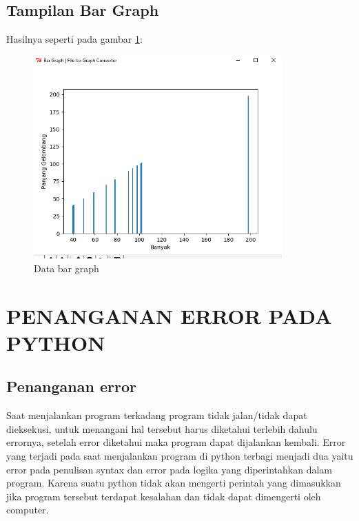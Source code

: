 \subsection{Tampilan Bar Graph}
Hasilnya seperti pada gambar \ref{fig:bargraph}:
\begin{figure}[!htbp]
	\centerline{\includegraphics[width=0.85\textwidth]{figures/3/bargraph.PNG}}
	\caption{Data bar graph}
	\label{fig:bargraph}
\end{figure}

\section{PENANGANAN ERROR PADA PYTHON}
\subsection{Penanganan error}
Saat menjalankan program terkadang program tidak jalan/tidak dapat dieksekusi, untuk menangani hal tersebut harus diketahui terlebih dahulu errornya, setelah error diketahui maka program dapat dijalankan kembali. Error yang terjadi pada saat menjalankan program di python terbagi menjadi dua yaitu error pada penulisan syntax dan error pada logika yang diperintahkan dalam program. Karena suatu python tidak akan mengerti perintah yang dimasukkan jika program tersebut terdapat kesalahan dan tidak dapat dimengerti oleh computer.

